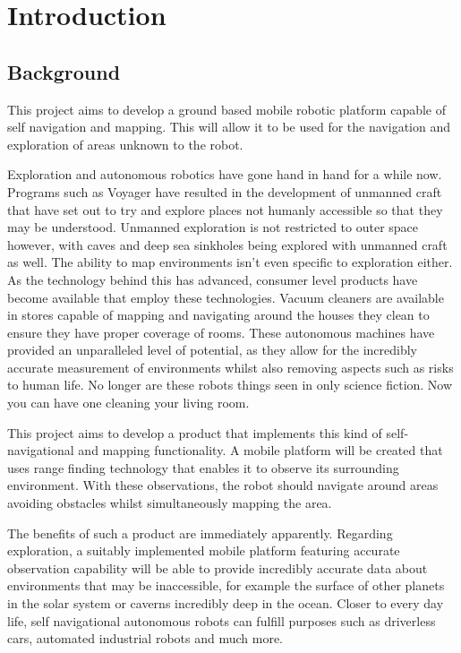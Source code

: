 \chapter{Introduction}\label{introduction}
	\section{Background}
	This project aims to develop a ground based mobile robotic platform capable of self navigation and mapping. This will allow it to be used for the navigation and exploration of areas unknown to the robot.
	
	Exploration and autonomous robotics have gone hand in hand for a while now. Programs such as Voyager have resulted in the development of unmanned craft that have set out to try and explore places not humanly accessible so that they may be understood. Unmanned exploration is not restricted to outer space however, with caves\citep{mcfarlane2013integrated} and deep sea sinkholes\citep{carnegie2007sinkhole} being explored with unmanned craft as well. The ability to map environments isn't even specific to exploration either. As the technology behind this has advanced, consumer level products have become available that employ these technologies. Vacuum cleaners are available in stores capable of mapping and navigating around the houses they clean to ensure they have proper coverage of rooms. These autonomous machines have provided an unparalleled level of potential, as they allow for the incredibly accurate measurement of environments whilst also removing aspects such as risks to human life. No longer are these robots things seen in only science fiction. Now you can have one cleaning your living room.
	
	This project aims to develop a product that implements this kind of self-navigational and mapping functionality. A mobile platform will be created that uses range finding technology that enables it to observe its surrounding environment. With these observations, the robot should navigate around areas avoiding obstacles whilst simultaneously mapping the area.
	
	The benefits of such a product are immediately apparently. Regarding exploration, a suitably implemented mobile platform featuring accurate observation capability will be able to provide incredibly accurate data about environments that may be inaccessible, for example the surface of other planets in the solar system or caverns incredibly deep in the ocean. Closer to every day life, self navigational autonomous robots can fulfill purposes such as driverless cars, automated industrial robots and much more.
	
